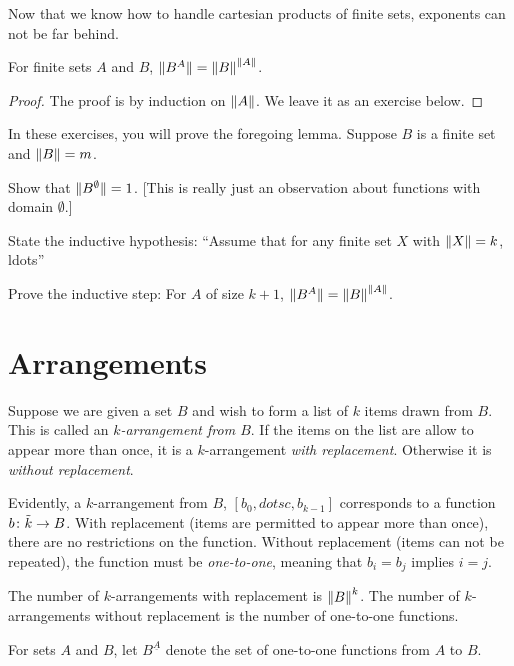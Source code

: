 Now that we know how to handle cartesian products of finite sets, exponents can not be far behind.

\begin{lemma}
	For finite sets $A$ and $B$, ${\lVert B^A\rVert} = {\lVert B\rVert}^{{\lVert A\rVert}}$.
	
	\begin{proof}
		The proof is by induction on ${\lVert A\rVert}$. We leave it as an exercise below.
	\end{proof}
\end{lemma}


\begin{exercises}
	In these exercises, you will prove the foregoing lemma.
	Suppose $B$ is a finite set and ${\lVert B\rVert}=m$.
	\begin{firstexercise}
		\item Show that ${\lVert B^\emptyset\rVert} = 1$. [This is really just an observation about functions with domain $\emptyset$.]
		\item State the inductive hypothesis: ``Assume that for any finite set $X$ with ${\lVert X\rVert} = k$, ldots''
		\item Prove the inductive step: For $A$ of size $k+1$, ${\lVert B^A\rVert} = {\lVert B\rVert}^{{\lVert A\rVert}}$. 
	\end{firstexercise}
\end{exercises}

\section{Arrangements}

Suppose we are given a set $B$ and wish to form a list of $k$ items drawn from $B$. This is called an \emph{$k$-arrangement from $B$}. 
If the items on the list are allow to appear more than once, it is a $k$-arrangement \emph{with replacement}. 
Otherwise it is \emph{without replacement}. 

Evidently, a $k$-arrangement from $B$, $[b_0,dotsc,b_{k-1}]$ corresponds to a function ${b}\colon{\tilde k}\to{B}$. 
With replacement (items are permitted to appear more than once), there are no restrictions on the function. 
Without replacement (items can not be repeated), the function must be \emph{one-to-one}, meaning that $b_i=b_j$ implies $i=j$.

The number of $k$-arrangements with replacement is ${\lVert B\rVert}^k$.
The number of $k$-arrangements without replacement is the number of one-to-one functions.

\begin{defn}
	For sets $A$ and $B$, let $B^{\underline A}$ denote the set of one-to-one functions from $A$ to $B$.
\end{defn}

